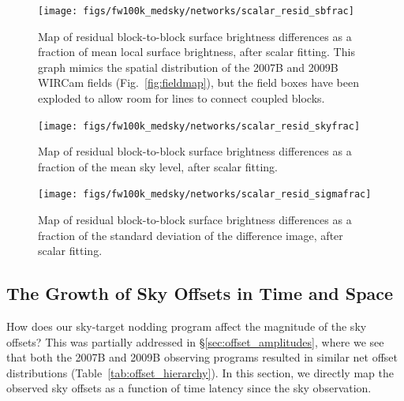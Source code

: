 \documentclass[iop]{emulateapj}
\newcommand{\Fig}[1]{Fig.~\ref{fig:#1}}  %
\newcommand{\Tab}[1]{Table~\ref{tab:#1}}  %
\newcommand{\Sec}[1]{\S\ref{sec:#1}}  %
\begin{document}
\begin{figure}[t]
\centering
\texttt{[image: figs/fw100k\_medsky/networks/scalar\_resid\_sbfrac]}
\caption{Map of residual block-to-block surface brightness differences as a fraction of mean local surface brightness, after scalar fitting.
  This graph mimics the spatial distribution of the 2007B and 2009B WIRCam fields (\Fig{fieldmap}), but the field boxes have been exploded to allow room for lines to connect coupled blocks.
}
\label{fig:fw100k_medsky_scalar_resid_sbfrac}
\end{figure}

\begin{figure}[t]
\centering
\texttt{[image: figs/fw100k\_medsky/networks/scalar\_resid\_skyfrac]}
\caption{Map of residual block-to-block surface brightness differences as a fraction of the mean sky level, after scalar fitting.}
\label{fig:fw100k_medsky_scalar_resid_skyfrac}
\end{figure}

\begin{figure}[t]
\centering
\texttt{[image: figs/fw100k\_medsky/networks/scalar\_resid\_sigmafrac]}
\caption{Map of residual block-to-block surface brightness differences as a fraction of the standard deviation of the difference image, after scalar fitting.}
\label{fig:fw100k_medsky_scalar_resid_sigmafrac}
\end{figure}


\subsection{The Growth of Sky Offsets in Time and Space}
\label{sec:offsetevo}


How does our sky-target nodding program affect the magnitude of the sky offsets?
This was partially addressed in \Sec{offset_amplitudes}, where we see that both the 2007B and 2009B observing programs resulted in similar net offset distributions (\Tab{offset_hierarchy}).
In this section, we directly map the observed sky offsets as a function of time latency since the sky observation.
\end{document}
